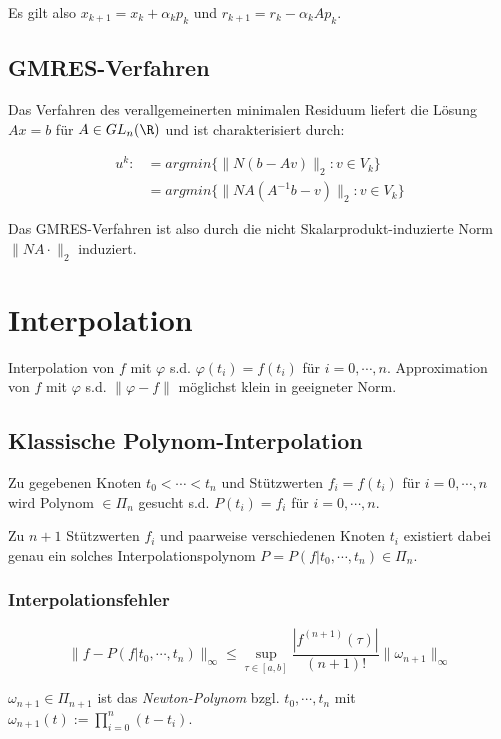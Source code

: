 Es gilt also $x_{k+1} = x_k + \alpha_k p_k$ und $r_{k+1} = r_k - \alpha_k A p_k$.

\subsection*{GMRES-Verfahren}

Das Verfahren des verallgemeinerten minimalen Residuum liefert die Lösung $Ax=b$ für $A \in GL_n(\R)$ und ist charakterisiert durch:

\vspace{-4mm}
\begin{align*}
	u^k :&= argmin\{\|N(b-Av)\|_2 : v \in V_k\} \\
	     &= argmin\{\|NA(A^{-1}b-v)\|_2 : v \in V_k\}
\end{align*}

Das GMRES-Verfahren ist also durch die nicht Skalarprodukt-induzierte  Norm $\|NA\cdot\|_2$ induziert.

\section*{Interpolation}

Interpolation von $f$ mit $\varphi$ s.d. $\varphi(t_i) = f(t_i)$ für $i = 0,\cdots, n$. Approximation von $f$ mit $\varphi$ s.d. $\|\varphi - f\|$ möglichst klein in geeigneter Norm.

\subsection*{Klassische Polynom-Interpolation}

Zu gegebenen Knoten $t_0 < \cdots < t_n$ und Stützwerten $f_i = f(t_i)$ für $i = 0,\cdots,n$ wird Polynom $ \in \Pi_n$ gesucht s.d. $P(t_i)=f_i$ für $i = 0,\cdots,n$.

Zu $n+1$ Stützwerten $f_i$ und paarweise verschiedenen Knoten $t_i$ existiert dabei genau ein solches Interpolationspolynom $P=P(f|t_0,\cdots,t_n) \in \Pi_n$.

\subsubsection*{Interpolationsfehler}

\vspace{-4mm}
$$\|f-P(f|t_0, \cdots, t_n)\|_\infty \leq \sup_{\tau \in [a,b]} \frac{|f^{(n+1)}(\tau)|}{(n+1)!} \|\omega_{n+1}\|_\infty$$

$\omega_{n+1} \in \Pi_{n+1}$ ist das \emph{Newton-Polynom} bzgl. $t_0, \cdots, t_n$ mit $\omega_{n+1}(t) := \prod_{i=0}^n (t-t_i)$.

